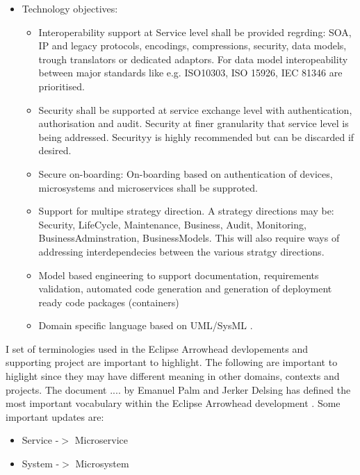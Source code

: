 \documentclass[a4paper]{arrowhead}
\begin{document}
\begin{itemize}
    
  \item Technology objectives: 
   \begin{itemize} 
      
    \item Interoperability support at Service level shall be provided
      regrding: SOA, IP and legacy protocols, encodings, compressions,
      security, data models, trough translators or dedicated
      adaptors. For data model interopeability between major standards
      like e.g. ISO10303, ISO 15926, IEC 81346 are prioritised.
      
    \item Security shall be supported at service exchange level with
      authentication, authorisation and audit. Security at finer
      granularity that service level is being addressed. Securityy is
      highly recommended but can be discarded if desired.  
      
    \item Secure on-boarding: On-boarding based on authentication of
      devices, microsystems and microservices shall be supproted.

    \item Support for multipe strategy direction. A strategy
      directions may be: Security, LifeCycle, Maintenance, Business,
      Audit, Monitoring, BusinessAdminstration, BusinessModels. This
      will also require ways of addressing interdependecies between
      the various stratgy directions.
    \item Model based engineering to support documentation,
      requirements validation, automated code generation and
      generation of deployment ready code packages (containers)
      \cite{Delsing2020,Delsing2021}

    \item Domain specific language based on UML/SysML \cite{Arrowhead_DSL}.
   
    \end{itemize}
    
  \end{itemize}
  

I set of terminologies used in the Eclipse Arrowhead devlopements and
supporting project are important to highlight. The following are
important to higlight since they may have different meaning in other
domains, contexts and projects. The document .... by Emanuel Palm and
Jerker Delsing has defined the most important vocabulary within the
Eclipse Arrowhead development \cite{Palm2019}. Some important updates
are:
\begin{itemize}
\item Service -$>$ Microservice
\item System -$>$ Microsystem

\end{itemize}
\end{document}
